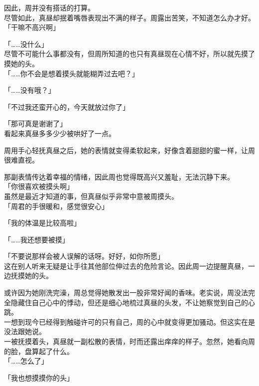 因此，周并没有搭话的打算。\\

尽管如此，真昼却抿着嘴唇表现出不满的样子。周露出苦笑，不知道怎么办才好。\\

「干嘛不高兴啊」

「……没什么」\\

尽管不可能什么事都没有，但周所知道的也只有真昼现在心情不好，所以就先摸了摸她的头。\\

「……你不会是想着摸头就能糊弄过去吧？」

「……没有哦？」

「不过我还蛮开心的，今天就放过你了」

「那可真是谢谢了」\\

看起来真昼多多少少被哄好了一点。

周用手心轻抚真昼之后，她的表情就变得柔软起来，好像含着甜甜的蜜一样，让周很难直视。

那副表情传达着幸福的情绪，因此周也觉得既高兴又羞耻，无法沉静下来。\\

「你很喜欢被摸头啊」\\

虽然是最近才知道的事，但真昼似乎非常中意被周摸头。\\

「周君的手很暖和，感觉很安心」

「我的体温是比较高啦」

「……我还想要被摸」

「不要说那样会被人误解的话呀。好好，如你所愿」\\

这在别人听来无疑是让手往其他部位伸过去的危险言论。因此周一边提醒真昼，一边抚摸她的头。

或许因为她刚洗完澡，周总觉得她散发出一股非常好闻的香味。老实说，周没法完全隐藏住自己心中的悸动，但还是细心地梳过真昼的头发，不让她察觉到自己的心跳。\\

一想到现今已经得到触碰许可的只有自己，周的心中就变得更加骚动。但这实在是没法跟她说。\\

一被抚摸着头，真昼就一副松散的表情，时而还露出痒痒的样子。忽然，她看向周的脸，盘算起了什么。\\

「……怎么了」

「我也想摸摸你的头」

